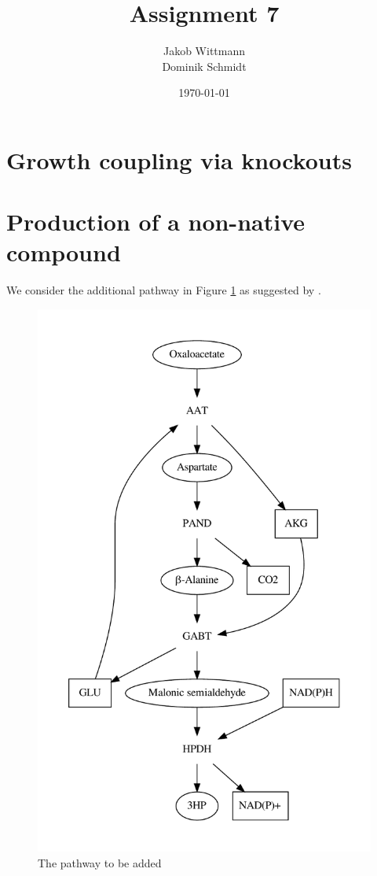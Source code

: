 \documentclass{scrartcl}
\title{Assignment 7}
\author{Jakob Wittmann\\Dominik Schmidt}
\date{\today}
\begin{document}
\maketitle
\section{Growth coupling via knockouts}
\section{Production of a non-native compound}
	We consider the additional pathway in Figure \ref{fig:pathway} as suggested by \cite{BORODINA201557}.
	\begin{figure}[h]
		\centering
		\includegraphics[max width=\linewidth, max height=0.5\paperheight]{2/new_pathway.pdf}
		\caption{The pathway to be added}
		\label{fig:pathway}
	\end{figure}
\end{document}
